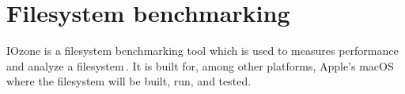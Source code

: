 \section{Filesystem benchmarking}
IOzone is a filesystem benchmarking tool which is used to measures performance and analyze a filesystem\,\cite{IozoneFilesystemBenchmark}. It is built for, among other platforms, Apple's macOS where the filesystem will be built, run, and tested. 